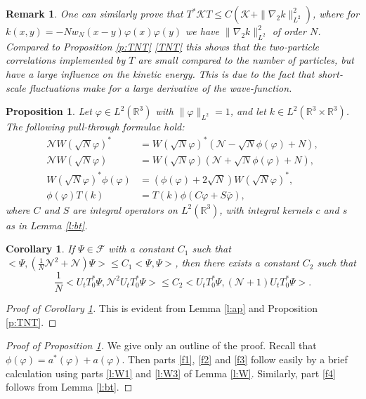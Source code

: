 \documentclass[11pt,a4paper,DIV11]{scrartcl}	%
\newtheorem{cor}[thm]{Corollary}
\newtheorem{prp}[thm]{Proposition}
\newtheorem*{rem}{Remark}
\newcommand{\R}{\mathds{R}}
\newcommand{\N}{\mathcal{N}}
\newcommand{\K}{\mathcal{K}}
\newcommand{\fock}{\mathcal{F}}		%
\newcommand{\Ncal}{\mathcal{N}}		%
\newcommand{\scal}[2]{\big<#1,#2\big>} %
\newcommand{\bd}{\begin{displaymath}}			%
\newcommand{\ed}{\end{displaymath}}
\begin{document}
\begin{rem}
One can similarly prove that $T^* \K T \le C (\K + \| \nabla_2 k \|_{L^2}^2)$, where for $k(x,y) = -N w_N(x-y) \varphi(x)\varphi(y)$ we have $\| \nabla_2 k \|_{L^2}^2$ of order $N$. Compared to Proposition \ref{p:TNT} \eqref{TNT} this shows that the two-particle correlations implemented by $T$ are small compared to the number of particles, but have a large influence on the kinetic energy. This is due to the fact that short-scale fluctuations make for a large derivative of the wave-function. 
\end{rem}

\begin{prp} \label{p:f}
  Let $\varphi \in L^2(\R^3)$ with $\| \varphi \|_{L^2} = 1$, and let $k \in
  L^2(\R^3 \times \R^3)$. The following pull-through formulae hold:
  \begin{align}
    \N W(\sqrt{N} \varphi)^* & = W(\sqrt{N} \varphi)^* (\N - \sqrt{N}
    \phi(\varphi) + N), \tag{i} \label{f1} \\
    \N W(\sqrt{N} \varphi) & = W(\sqrt{N} \varphi) (\N + \sqrt{N}
    \phi(\varphi) + N), \tag{ii} \label{f2} \\
    W(\sqrt{N} \varphi)^* \phi(\varphi) & = (\phi(\varphi) + 2 \sqrt{N})
    W(\sqrt{N} \varphi)^*, \tag{iii} \label{f3} \\
    \phi(\varphi) T(k) & = T(k) \phi(C \varphi + S \overline{\varphi}),
    \tag{iv} \label{f4} 
  \end{align}
  where $C$ and $S$ are integral operators on $L^2(\R^3)$, with integral
  kernels $c$ and $s$ as in Lemma \ref{l:bt}.
\end{prp}

\begin{cor}
\label{cor:N2}
If $\Psi \in \fock$ with a constant $C_1$ such that $\scal{\Psi}{\left( \frac{1}{N}\Ncal^2+\Ncal \right)\Psi} \leq C_1 \scal{\Psi}{\Psi}$, then there exists a constant $C_2$ such that
\bd
\frac{1}{N}\scal{U_t T^\ast_0 \Psi}{\Ncal^2 U_t T^\ast_0 \Psi} \leq C_2 \scal{U_t T^\ast_0 \Psi}{\left(\Ncal+1\right)U_t T^\ast_0 \Psi}.
\ed
\end{cor}
\begin{proof}[Proof of Corollary \ref{cor:N2}]
This is evident from Lemma \ref{l:ap} and Proposition \ref{p:TNT}.
\end{proof}

\begin{proof}[Proof of Proposition \ref{p:f}]
  We give only an outline of the proof. Recall that $\phi(\varphi) =
  a^*(\varphi) + a(\varphi)$. Then parts \eqref{f1}, \eqref{f2} and \eqref{f3}
  follow easily by a brief calculation using parts \ref{l:W1} and \ref{l:W3}
  of Lemma \ref{l:W}. Similarly, part \eqref{f4} follows from Lemma
  \ref{l:bt}.
\end{proof}
\end{document}
